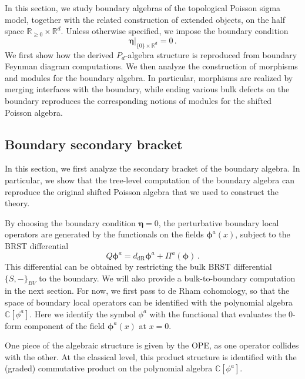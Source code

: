 \documentclass[11pt]{article}
\newcommand{\C}{\mathbb{C}}
\newcommand{\R}{\mathbb{R}}
\newcommand{\derham}{\mathrm{dR}}
\numberwithin{equation}{section}
\begin{document}
 In this section, we study boundary algebras of the topological Poisson sigma model, together with the related construction of extended objects, on the half space $\R_{\geq 0}\times \R^d$. Unless otherwise specified, we impose the boundary condition
\begin{equation}
	\boldsymbol{\eta}|_{\{0\}\times \R^d} = 0\,.
\end{equation}
We first show how the derived $P_d$-algebra structure is reproduced from boundary Feynman diagram computations. We then analyze the construction of morphisms and modules for the boundary algebra. In particular, morphisms are realized by merging interfaces with the boundary, while ending various bulk defects on the boundary reproduces the corresponding notions of modules for the shifted Poisson algebra.

\subsection{Boundary secondary bracket}
\label{sec:bdy_sec}
In this section, we first analyze the secondary bracket of the boundary algebra. In particular, we show that the tree-level computation of the boundary algebra can reproduce the original shifted Poisson algebra that we used to construct the theory. 
 
 By choosing the boundary condition $\boldsymbol{\eta} = 0$, the perturbative boundary local operators are generated by the functionals on the fields $\boldsymbol{\phi}^a(x)$, subject to the BRST differential
 \begin{equation}
 	Q\boldsymbol{\phi}^a = d_{\derham} \boldsymbol{\phi}^a + \Pi^{a}(\boldsymbol{\phi})\,.
 \end{equation}
This differential can be obtained by restricting the bulk BRST differential $\{S,-\}_{BV}$ to the boundary. We will also provide a bulk-to-boundary computation in the next section. For now, we first pass to de Rham cohomology, so that the space of boundary local operators can be identified with the polynomial algebra $\C[\phi^a]$. Here we identify the symbol $\phi^a$ with the functional that evaluates the $0$-form component of the field $\boldsymbol{\phi}^a(x)$ at $x=0$.

One piece of the algebraic structure is given by the OPE, as one operator collides with the other. At the classical level, this product structure is identified with the (graded) commutative product on the polynomial algebra $\C[\phi^a]$.
 
\end{document}
